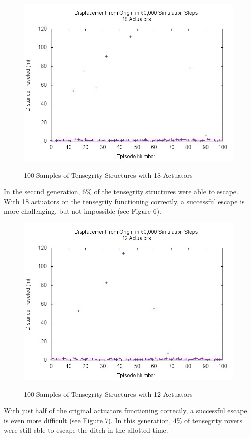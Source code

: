 \documentclass{llncs}
\begin{document}
\label{robust18} {
\begin{figure}
\label{robust18scatter}
\centering
{\includegraphics[width=1\linewidth]{Pictures/dists75.jpg}} 
\caption{100 Samples of Tensegrity Structures with 18 Actuators}
\end{figure}

In the second generation, $6\%$ of the tensegrity structures were able to escape.
With 18 actuators on the tensegrity functioning correctly, a successful escape is more challenging, but not impossible (see Figure $6$).
} 
                       
\label{robust12} {
\begin{figure}
\label{robust12scatter}
\centering
{\includegraphics[width=1\linewidth]{Pictures/dists50.jpg}} 
\caption{100 Samples of Tensegrity Structures with 12 Actuators}
\end{figure}

With just half of the original actuators functioning correctly, a successful escape is even more difficult (see Figure $7$).
In this generation, $4\%$ of tensegrity rovers were still able to escape the ditch in the allotted time.
} 
\end{document}
